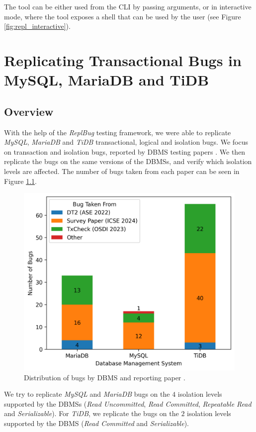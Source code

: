 The tool can be either used from the CLI by passing arguments, or in interactive mode, where the tool exposes a shell that can be used by the user  (see Figure \ref{fig:repl_interactive}).

\chapter{Replicating Transactional Bugs in MySQL, MariaDB and TiDB}

\section{Overview}

With the help of the \textit{ReplBug} testing framework, we were able to replicate \textit{MySQL}, \textit{MariaDB} and \textit{TiDB} transactional, logical and isolation bugs. We focus on transaction and isolation bugs, reported by DBMS testing papers \cite{cui2024understanding_ICSE2024, dou2023detecting_ICSE2023, cui2022differentially_ASE2022}. We then replicate the bugs on the same versions of the DBMSs, and verify which isolation levels are affected. The number of bugs taken from each paper can be seen in Figure \ref{fig:bugs_by_paper}.


\begin{figure}
    \centering
    \includegraphics[width=0.7\linewidth]{assets/bug_replication_bugs_by_dbms_and_paper.png}
    \caption{Distribution of bugs by DBMS and reporting paper  \cite{cui2024understanding_ICSE2024, dou2023detecting_ICSE2023, cui2022differentially_ASE2022}.}
    \label{fig:bugs_by_paper}
\end{figure}

We try to replicate \textit{MySQL} and \textit{MariaDB} bugs on the $4$ isolation levels supported by the DBMSs (\textit{Read Uncommitted}, \textit{Read Committed}, \textit{Repeatable Read} and \textit{Serializable}). For \textit{TiDB}, we replicate the bugs on the $2$ isolation levels supported by the DBMS (\textit{Read Committed} and \textit{Serializable}).


